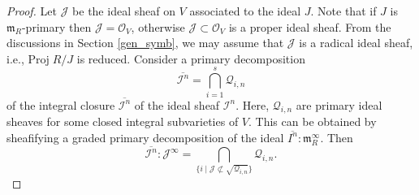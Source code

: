\documentclass[12pt,a4paper]{amsart}
\theoremstyle{plain}
\theoremstyle{definition}
\numberwithin{equation}{theorem}
\begin{document}
\begin{proof}
Let $\mathcal{J}$ be the ideal sheaf on $V$ associated to the ideal $J$. Note that if $J$ is $\mathfrak{m}_R$-primary then $\mathcal{J}=\mathcal{O}_V$, otherwise $\mathcal{J}\subset \mathcal{O}_V$ is a proper ideal sheaf. From the discussions in Section \ref{gen_symb}, we may assume that $\mathcal{J}$ is a radical ideal sheaf, i.e., $\mathrm{Proj}\;R/J$ is reduced. Consider a primary decomposition $$\overline{\mathcal{I}^n} = \bigcap_{i=1}^s \mathcal{Q}_{i,n}$$ of the integral closure $\overline{\mathcal{I}^n}$ of the ideal sheaf $\mathcal{I}^n$. Here, $\mathcal{Q}_{i,n}$ are primary ideal sheaves for some closed integral subvarieties of $V$. This can be obtained by sheafifying a graded primary decomposition of the ideal $\overline{I^n} \colon \mathfrak{m}_R^{\infty}$. Then $$\overline{\mathcal{I}^n} : \mathcal{J}^{\infty} = \bigcap_{\{i \mid \mathcal{J} \not\subset \sqrt{\mathcal{Q}_{i,n}}\}} \mathcal{Q}_{i,n}.$$


\end{proof}
\end{document}
